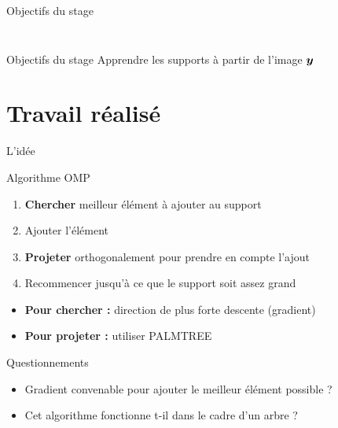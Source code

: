 \begin{frame}{Objectifs du stage}
\begin{columns}
\begin{column}{0.20\textwidth}
\begin{figure}
\end{figure}\end{column}
\end{columns}
\begin{exampleblock}{Objectifs du stage}
Apprendre les supports à partir de l'image $\bm{y}$
\end{exampleblock}
\end{frame}




\section{Travail réalisé}

\begin{frame}{L'idée}
\begin{block}{Algorithme OMP}
	\begin{enumerate}
		\item \textbf{Chercher} meilleur élément à ajouter au support
		\item Ajouter l'élément
		\item \textbf{Projeter} orthogonalement pour prendre en compte l'ajout
		\item Recommencer jusqu'à ce que le support soit assez grand
	\end{enumerate}
\end{block}
\begin{itemize}
\item \textbf{Pour chercher :} direction de plus forte descente (gradient)
\item \textbf{Pour projeter :} utiliser PALMTREE
\end{itemize}
\begin{exampleblock}{Questionnements}
\begin{itemize}
	\item Gradient convenable pour ajouter le meilleur élément possible ?
	\item Cet algorithme fonctionne t-il dans le cadre d'un arbre ?
\end{itemize}
\end{exampleblock}
\end{frame}


